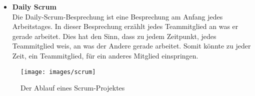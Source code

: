 \begin{itemize}
\item{\textbf{Daily Scrum}}\\
Die Daily-Scrum-Besprechung ist eine Besprechung am Anfang jedes Arbeitstages. In dieser Besprechung erzählt jedes Teammitglied an was er gerade arbeitet. Dies hat den Sinn, dass zu jedem Zeitpunkt, jedes Teammitglied weis, an was der Andere gerade arbeitet. Somit könnte zu jeder Zeit, ein Teammitglied, für ein anderes Mitglied einspringen.


\end{itemize}

\begin{figure}[H]
\centering
\texttt{[image: images/scrum]}
\caption{Der Ablauf eines Scrum-Projektes}
\end{figure}
\newpage


